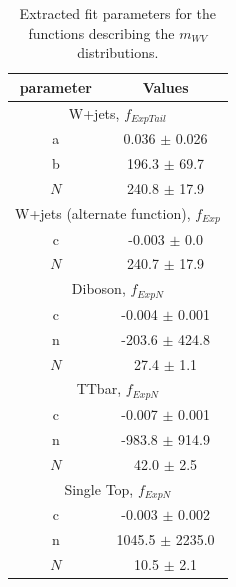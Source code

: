 \begin{table}[!htbp]
	\centering
	\begin{tabular}{||c | c||} 
	 \hline
	 parameter & Values \\
	 \hline \hline
	 \multicolumn{2}{|c|}{W+jets, $f_{ExpTail}$}\\
	 \hline
	 a 			&	0.036 $\pm$ 0.026\\
	 b 			&	196.3	$\pm$ 69.7\\
	 $N$ 		&	240.8 $\pm$ 17.9\\
	 \hline \hline
	 \multicolumn{2}{|c|}{W+jets (alternate function), $f_{Exp}$}\\
	 \hline
	 c 			&	-0.003 $\pm$ 0.0\\
	 $N$ 		&	240.7 $\pm$ 17.9\\
	 \hline \hline
	 \multicolumn{2}{|c|}{Diboson, $f_{ExpN}$}\\
	 \hline
	 c 			&	-0.004 $\pm$ 0.001\\
	 n 			&	-203.6 $\pm$ 424.8\\
	 $N$ 		&	27.4 $\pm$ 1.1\\
	 \hline \hline
	 \multicolumn{2}{|c|}{TTbar, $f_{ExpN}$}\\
	 \hline
	 c 			&	-0.007 $\pm$ 0.001\\
	 n 			&	-983.8 $\pm$ 914.9\\
	 $N$ 		&	42.0 $\pm$ 2.5\\
	 \hline \hline
	 \multicolumn{2}{|c|}{Single Top, $f_{ExpN}$}\\
	 \hline
	 c 			&	-0.003 $\pm$ 0.002\\
	 n 			&	1045.5 $\pm$ 2235.0\\
	 $N$ 		&	10.5 $\pm$ 2.1\\
	 \hline \hline
	\end{tabular}
 	\caption{Extracted fit parameters for the functions describing the $m_{WV}$ distributions.}
 	\label{Table:BackgroundEstimation_mWWFitPars}
\end{table}


